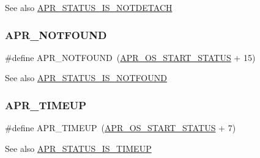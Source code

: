 \begin{DoxySeeAlso}{See also}
\mbox{\hyperlink{group___a_p_r___s_t_a_t_u_s___i_s_ga3084551fdf84919e3c3db4384234521d}{A\+P\+R\+\_\+\+S\+T\+A\+T\+U\+S\+\_\+\+I\+S\+\_\+\+N\+O\+T\+D\+E\+T\+A\+CH}} 
\end{DoxySeeAlso}
\mbox{\label{group___a_p_r___error_ga9bd83273ff02f31f71fb4dc6f29df4a9}} 
\subsubsection{\texorpdfstring{A\+P\+R\+\_\+\+N\+O\+T\+F\+O\+U\+ND}{APR\_NOTFOUND}}
{\footnotesize\ttfamily \#define A\+P\+R\+\_\+\+N\+O\+T\+F\+O\+U\+ND~(\mbox{\hyperlink{group__apr__errno_ga450e1a5734732e092ddaa5b67414f69b}{A\+P\+R\+\_\+\+O\+S\+\_\+\+S\+T\+A\+R\+T\+\_\+\+S\+T\+A\+T\+US}} + 15)}

\begin{DoxySeeAlso}{See also}
\mbox{\hyperlink{group___a_p_r___s_t_a_t_u_s___i_s_ga51bc0a0e249f5d09dba3ed9dc02c49e5}{A\+P\+R\+\_\+\+S\+T\+A\+T\+U\+S\+\_\+\+I\+S\+\_\+\+N\+O\+T\+F\+O\+U\+ND}} 
\end{DoxySeeAlso}
\mbox{\label{group___a_p_r___error_ga9ac087c25ffb0d3bb4d75bee36709853}} 
\subsubsection{\texorpdfstring{A\+P\+R\+\_\+\+T\+I\+M\+E\+UP}{APR\_TIMEUP}}
{\footnotesize\ttfamily \#define A\+P\+R\+\_\+\+T\+I\+M\+E\+UP~(\mbox{\hyperlink{group__apr__errno_ga450e1a5734732e092ddaa5b67414f69b}{A\+P\+R\+\_\+\+O\+S\+\_\+\+S\+T\+A\+R\+T\+\_\+\+S\+T\+A\+T\+US}} + 7)}

\begin{DoxySeeAlso}{See also}
\mbox{\hyperlink{group___a_p_r___s_t_a_t_u_s___i_s_ga864b207719c86ac4deeba696943262d0}{A\+P\+R\+\_\+\+S\+T\+A\+T\+U\+S\+\_\+\+I\+S\+\_\+\+T\+I\+M\+E\+UP}} 
\end{DoxySeeAlso}
